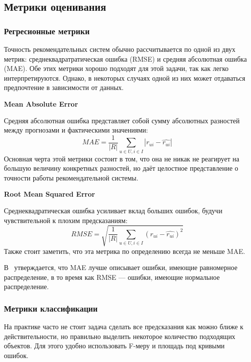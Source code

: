 \subsection{Метрики оценивания}\label{subsec:estimation_metrics}

\subsubsection{Регресионные метрики}
Точность рекомендательных систем обычно рассчитывается по одной из двух метрик: среднеквадратратическая ошибка (RMSE) и средняя абсолютная ошибка (MAE).
Обе этих метрики хорошо подходят для этой задачи, так как легко интерпретируются.
Однако, в некоторых случаях одной из них может отдаваться предпочтение в зависимости от данных.

\vspace{1em}
\textbf{Mean Absolute Error}

Средняя абсолютная ошибка представляет собой сумму абсолютных разностей между прогнозами и фактическими значениями:
\begin{equation}\label{eq:mae}
MAE = \frac{1}{|R|} \sum_{u \in U , i \in I} |r_{ui} - \hat{r_{ui}}|
\end{equation}
Основная черта этой метрики состоит в том, что она не никак не реагирует на большую величину конкретных разностей, но даёт целостное представление о точности работы рекомендательной системы.

\vspace{1em}
\textbf{Root Mean Squared Error}

Среднеквадратическая ошибка усиливает вклад больших ошибок, будучи чувствительной к плохим предсказаниям:
\begin{equation}\label{eq:rmse}
RMSE = \sqrt{\frac{1}{|R|} \sum_{u \in U , i \in I} (r_{ui} - \hat{r_{ui}})^2}
\end{equation}
Также стоит заметить, что эта метрика по определению всегда не меньше MAE\@.

В~\cite{chai} утверждается, что MAE лучше описывает ошибки, имеющие равномерное распределение, в то время как RMSE --- ошибки, имеющие нормальное распределение.

\subsubsection{Метрики классификации}
На практике часто не стоит задача сделать все предсказания как можно ближе к действительности, но правильно выделить некоторое количество подходящих объектов.
Для этого удобно использовать F-меру и площадь под кривыми ошибок.

